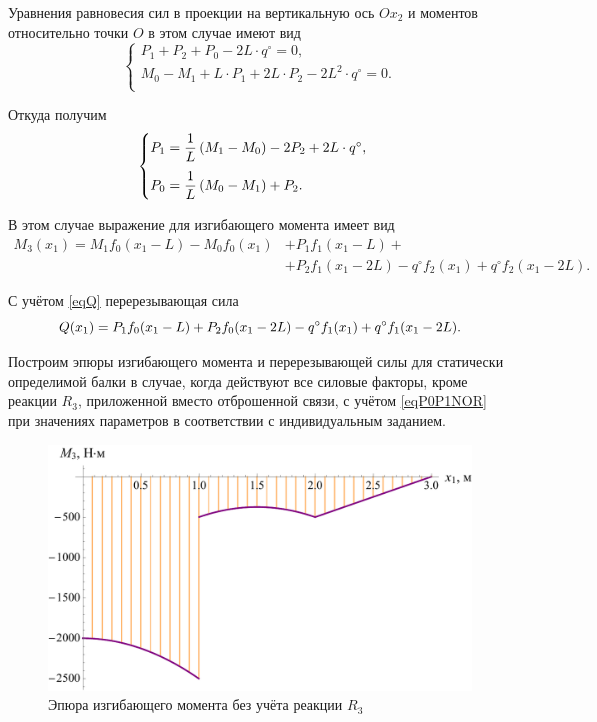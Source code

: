 \documentclass[12pt, a4paper]{article}
\begin{document}
	Уравнения равновесия сил в проекции на вертикальную ось $Ox_2$ и моментов относительно точки $O$ в этом случае имеют вид
	\vspace{-0.5em}
	\begin{equation*}
		\begin{cases}
			P_1 + P_2 + P_0 - 2L \cdot q^{\circ} = 0, \\
			M_0 - M_1 + L \cdot P_1 + 2L \cdot P_2 - 2 L^2 \cdot q^{\circ} = 0. \\
		\end{cases}
	\end{equation*}
	
	Откуда получим
	\begin{equation}
		\begin{cases} \vspace{0.75em}
			P_1 = \dfrac{1}{L} \left( M_1 - M_0 \right) - 2 P_2 + 2L \cdot q^{\circ}, \\ 
			P_0 = \dfrac{1}{L} \left( M_0 - M_1 \right) + P_2. \\
		\end{cases}
		\label{eqP0P1NOR}
	\end{equation}
	
	В этом случае выражение для изгибающего момента имеет вид
	\begin{equation}
		\begin{split}
			M_3(x_1) = M_1 f_0(x_1 - L) - M_0 f_0(x_1) & + P_1 f_1(x_1 - L) + \\ & + P_2 f_1(x_1 - 2L) - q^{\circ} f_2(x_1) + q^{\circ} f_2(x_1 - 2L).
		\end{split}
		\label{eqM3NOR}
	\end{equation}
	
	С учётом \eqref{eqQ} перерезывающая сила
	\begin{equation}
		Q(x_1) = P_1 f_0(x_1 - L) + P_2 f_0(x_1 - 2L) - q^{\circ} f_1(x_1) + q^{\circ} f_1(x_1 - 2L).\\
		\label{eqQNOR}
	\end{equation}
	
	Построим эпюры изгибающего момента и перерезывающей силы для статически определимой балки в случае, когда действуют все силовые факторы, кроме реакции $R_3$, приложенной вместо отброшенной связи, с учётом \eqref{eqP0P1NOR} при  значениях параметров в соответствии с индивидуальным заданием.
	
	\newpage
	
	\begin{figure}[!h]
		\centering
		\includegraphics[width=0.7\linewidth]{plot-8}
		\caption{Эпюра изгибающего момента без учёта реакции $R_3$}
	\end{figure} 
	
\end{document}
